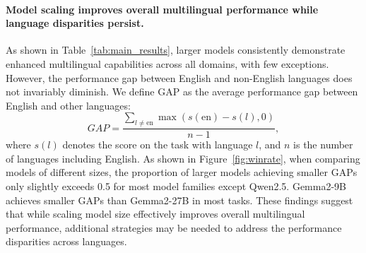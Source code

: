 \paragraph{Model scaling improves overall multilingual performance while language disparities persist.}
As shown in Table~\ref{tab:main_results}, larger models consistently demonstrate enhanced multilingual capabilities across all domains, with few exceptions.
However, the performance gap between English and non-English languages does not invariably diminish.
We define GAP as the average performance gap between English and other languages:
$$GAP=\frac{\sum_{l\neq \mathrm{en}}\max(s(\mathrm{en}) - s(l), 0)}{n-1},$$ where $s(l)$ denotes the score on the task with language $l$, and $n$ is the number of languages including English.
As shown in Figure~\ref{fig:winrate}, when comparing models of different sizes, the proportion of larger models achieving smaller GAPs only slightly exceeds 0.5 for most model families except Qwen2.5.
Gemma2-9B achieves smaller GAPs than Gemma2-27B in most tasks.
These findings suggest that while scaling model size effectively improves overall multilingual performance, additional strategies may be needed to address the performance disparities across languages.



